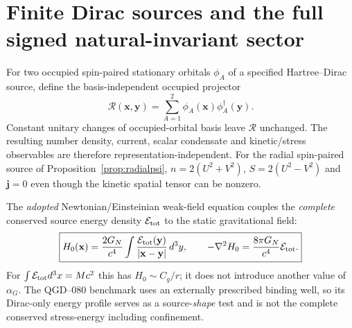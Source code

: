\documentclass[11pt,a4paper]{article}
\theoremstyle{remark}
\begin{document}
\section{Finite Dirac sources and the full signed natural-invariant sector}\label{sec:signed}
For two occupied spin-paired stationary orbitals $\phi_A$ of a specified
Hartree--Dirac source, define the basis-independent occupied projector
\begin{equation}\label{eq:projector}
\boxed{\mathcal R(\mathbf x,\mathbf y)
=\sum_{A=1}^2\phi_A(\mathbf x)\phi_A^\dagger(\mathbf y).}
\end{equation}
Constant unitary changes of occupied-orbital basis leave $\mathcal R$
unchanged. The resulting number density, current, scalar condensate
and kinetic/stress observables are therefore representation-independent.
For the radial spin-paired source of Proposition~\ref{prop:radialpsi},
$n=2(U^2+V^2)$, $S=2(U^2-V^2)$ and $\mathbf j=0$ even though the
kinetic spatial tensor can be nonzero.

The \emph{adopted} Newtonian/Einsteinian weak-field equation couples
the \emph{complete} conserved source energy density $\mathcal E_{\rm tot}$
to the static gravitational field:
\begin{equation}\label{eq:poissonstate}
\boxed{H_0(\mathbf x)=\frac{2G_N}{c^4}
\int\frac{\mathcal E_{\rm tot}(\mathbf y)}
{|\mathbf x-\mathbf y|}\,d^3y,\qquad
-\nabla^2 H_0=\frac{8\pi G_N}{c^4}\mathcal E_{\rm tot}.}
\end{equation}
For $\int\mathcal E_{\rm tot}d^3x=Mc^2$ this has
$H_0\sim C_g/r$; it does not introduce another value of $\alpha_G$.
The QGD--080 benchmark uses an externally prescribed binding well, so
its Dirac-only energy profile serves as a source-\emph{shape} test and
is not the complete conserved stress-energy including confinement.
\end{document}
